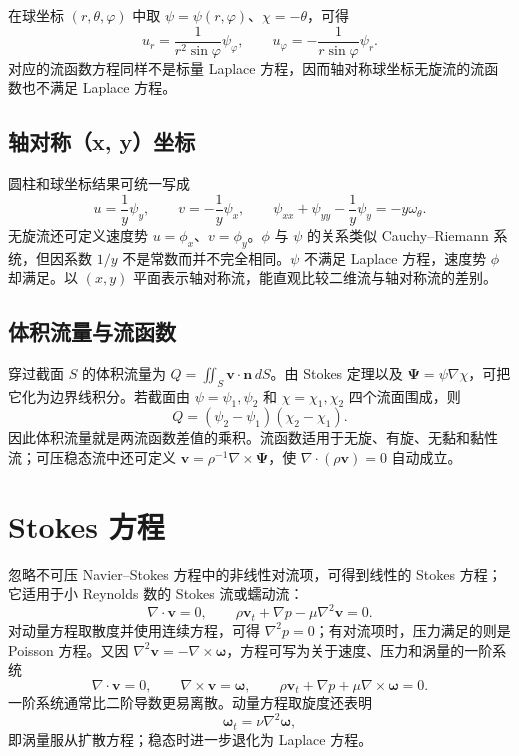 \documentclass[11pt,a4paper,openany,fontset=none]{ctexbook}
\begin{document}
在球坐标 $(r,\theta,\varphi)$ 中取 $\psi=\psi(r,\varphi)$、$\chi=-\theta$，可得
\begin{equation}
 u_r=\frac{1}{r^2\sin\varphi}\psi_\varphi,\qquad
 u_\varphi=-\frac{1}{r\sin\varphi}\psi_r. \tag{4.24.12}
\end{equation}
对应的流函数方程同样不是标量 Laplace 方程，因而轴对称球坐标无旋流的流函数也不满足 Laplace 方程。

\subsection{轴对称（x, y）坐标}

圆柱和球坐标结果可统一写成
\begin{equation}
 u=\frac1y\psi_y,\qquad v=-\frac1y\psi_x,\qquad
 \psi_{xx}+\psi_{yy}-\frac1y\psi_y=-y\omega_\theta. \tag{4.24.14--4.24.15}
\end{equation}
无旋流还可定义速度势 $u=\phi_x$、$v=\phi_y$。$\phi$ 与 $\psi$ 的关系类似 Cauchy--Riemann 系统，但因系数 $1/y$ 不是常数而并不完全相同。$\psi$ 不满足 Laplace 方程，速度势 $\phi$ 却满足。以 $(x,y)$ 平面表示轴对称流，能直观比较二维流与轴对称流的差别。

\subsection{体积流量与流函数}

穿过截面 $S$ 的体积流量为 $Q=\iint_S\bm v\cdot\bm n\,dS$。由 Stokes 定理以及 $\bm\Psi=\psi\nabla\chi$，可把它化为边界线积分。若截面由 $\psi=\psi_1,\psi_2$ 和 $\chi=\chi_1,\chi_2$ 四个流面围成，则
\begin{equation}
 Q=(\psi_2-\psi_1)(\chi_2-\chi_1). \tag{4.24.21}
\end{equation}
因此体积流量就是两流函数差值的乘积。流函数适用于无旋、有旋、无黏和黏性流；可压稳态流中还可定义 $\bm v=\rho^{-1}\nabla\times\bm\Psi$，使 $\nabla\cdot(\rho\bm v)=0$ 自动成立。

\section{Stokes 方程}

忽略不可压 Navier--Stokes 方程中的非线性对流项，可得到线性的 Stokes 方程；它适用于小 Reynolds 数的 Stokes 流或蠕动流：
\begin{equation}
 \nabla\cdot\bm v=0,\qquad
 \rho\bm v_t+\nabla p-\mu\nabla^2\bm v=0. \tag{4.25.1--4.25.2}
\end{equation}
对动量方程取散度并使用连续方程，可得 $\nabla^2p=0$；有对流项时，压力满足的则是 Poisson 方程。又因 $\nabla^2\bm v=-\nabla\times\bm\omega$，方程可写为关于速度、压力和涡量的一阶系统
\begin{equation}
 \nabla\cdot\bm v=0,\qquad \nabla\times\bm v=\bm\omega,\qquad
 \rho\bm v_t+\nabla p+\mu\nabla\times\bm\omega=0. \tag{4.25.8--4.25.10}
\end{equation}
一阶系统通常比二阶导数更易离散。动量方程取旋度还表明
\begin{equation}
 \bm\omega_t=\nu\nabla^2\bm\omega, \tag{4.25.12}
\end{equation}
即涡量服从扩散方程；稳态时进一步退化为 Laplace 方程。
\end{document}
